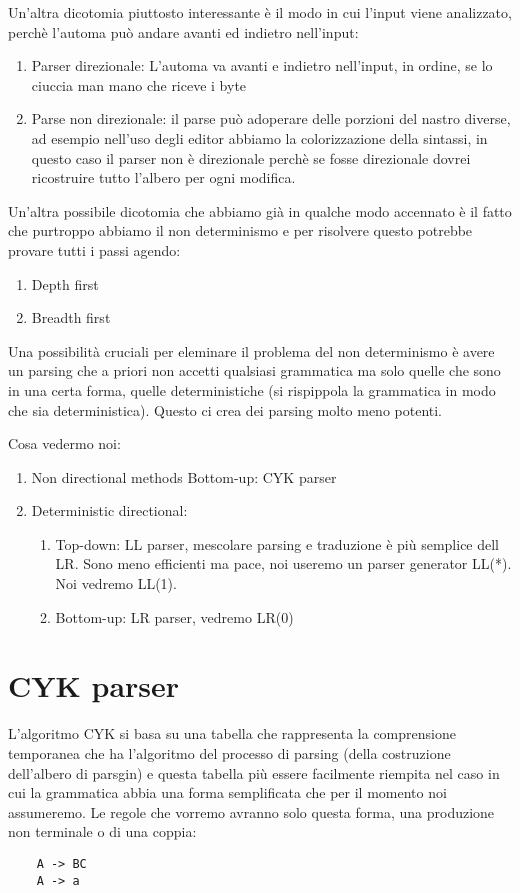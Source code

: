Un'altra dicotomia piuttosto interessante è il modo in cui l'input viene analizzato, perchè l'automa può andare avanti ed indietro nell'input:
\begin{enumerate}
    \item Parser direzionale: L'automa va avanti e indietro nell'input, in ordine, se lo ciuccia man mano che riceve i byte
    \item Parse non direzionale: il parse può adoperare delle porzioni del nastro diverse, ad esempio nell'uso degli editor abbiamo la colorizzazione della sintassi, in questo caso il parser non è direzionale perchè se fosse direzionale dovrei ricostruire tutto l'albero per ogni modifica.
\end{enumerate}

Un'altra possibile dicotomia che abbiamo già in qualche modo accennato è il fatto che purtroppo abbiamo il non determinismo e per risolvere questo potrebbe provare tutti i passi agendo:
\begin{enumerate}
    \item Depth first
    \item Breadth first
\end{enumerate}

Una possibilità cruciali per eleminare il problema del non determinismo è avere un parsing che a priori non accetti qualsiasi grammatica ma solo quelle che sono in una certa forma, quelle deterministiche (si rispippola la grammatica in modo che sia deterministica). Questo ci crea dei parsing molto meno potenti.

Cosa vedermo noi:
\begin{enumerate}
    \item Non directional methods Bottom-up: CYK parser
    \item Deterministic directional:
    \begin{enumerate}
        \item Top-down: LL parser, mescolare parsing e traduzione è più semplice dell LR. Sono meno efficienti ma pace, noi useremo un parser generator LL(*). Noi vedremo LL(1).
        \item Bottom-up: LR parser, vedremo LR(0)
    \end{enumerate}
\end{enumerate}

\section{CYK parser}
L'algoritmo CYK si basa su una tabella che rappresenta la comprensione temporanea che ha l'algoritmo del processo di parsing (della costruzione dell'albero di parsgin) e questa tabella più essere facilmente riempita nel caso in cui la grammatica abbia una forma semplificata che per il momento noi assumeremo. Le regole che vorremo avranno solo questa forma, una produzione non terminale o di una coppia:
\begin{lstlisting}
    A -> BC
    A -> a
\end{lstlisting}

